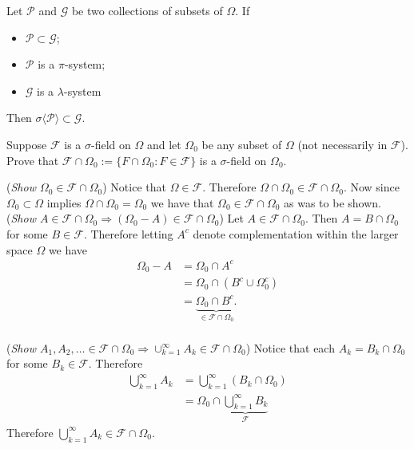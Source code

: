 \begin{theorem}
Let $\mathcal P$ and $\mathcal G$ be two collections of subsets of $\Omega$. If
\begin{itemize}
\item $\mathcal P\subset \mathcal G$;
\item $\mathcal P$ is a $\pi$-system;
\item $\mathcal G$ is a $\lambda$-system
\end{itemize}
Then  $\sigma\langle\mathcal P\rangle\subset \mathcal G$.
\end{theorem}





\begin{exercise} \label{sliceoutF}
Suppose $\mathcal F$ is a $\sigma$-field on $\Omega$ and let $\Omega_0$ be any subset of $\Omega$ (not necessarily in $\mathcal F$). Prove that $\mathcal F\cap \Omega_0 := \{ F\cap \Omega_0: F\in \mathcal F\}$ is a $\sigma$-field on $\Omega_0$. \end{exercise}

\begin{exerciseproof}

\flushleft\textbullet({\sl Show $\Omega_0\in \mathcal F\cap \Omega_0$})
Notice that $\Omega \in \mathcal F$. Therefore $\Omega\cap \Omega_0\in \mathcal F\cap \Omega_0$. Now since $\Omega_0\subset \Omega$ implies $\Omega\cap\Omega_0= \Omega_0$ we have that $\Omega_0\in \mathcal F\cap \Omega_0$ as was to be shown.
\\
\textbullet({\sl Show $A\in \mathcal F\cap \Omega_0\Rightarrow (\Omega_0 - A)\in \mathcal F\cap \Omega_0$}) Let $A\in \mathcal F\cap \Omega_0$. Then $A = B\cap \Omega_0$ for some $B\in\mathcal F$. Therefore letting $A^c$ denote complementation within the larger space $\Omega$ we have
\begin{align*}
\Omega_0-A & = \Omega_0 \cap A^c\\
& =\Omega_0 \cap (B^c \cup \Omega_0^c)\\
& =\underbrace{\Omega_0 \cap B^c.}_{\in\mathcal F\cap \Omega_0}
\end{align*}
\\
\textbullet({\sl Show $A_1,A_2,\ldots \in \mathcal F\cap \Omega_0\Rightarrow \cup_{k=1}^\infty A_k\in \mathcal F\cap \Omega_0$}) Notice that each $A_k = B_k\cap \Omega_0$ for some $B_k\in\mathcal F$. Therefore
\begin{align*}
\bigcup_{k=1}^\infty A_k &=\bigcup_{k=1}^\infty (B_k\cap \Omega_0)\\
&=\Omega_0\cap \underbrace{\bigcup_{k=1}^\infty B_k}_{\mathcal F}
\end{align*}
Therefore $\bigcup_{k=1}^\infty A_k \in \mathcal F\cap \Omega_0$.
\end{exerciseproof}





